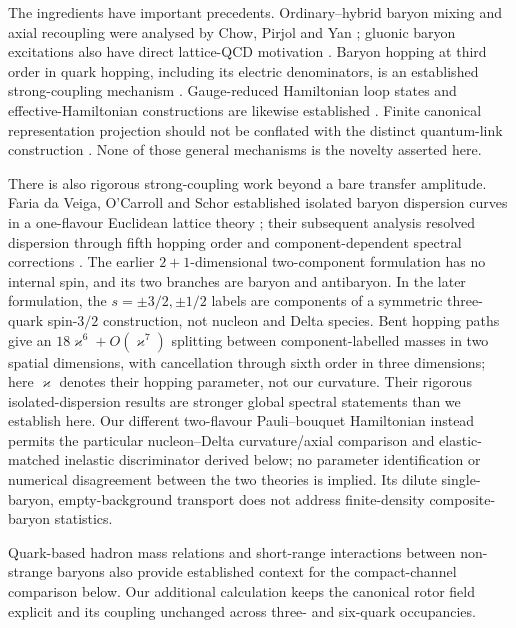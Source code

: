 \documentclass[11pt]{article}
\begin{document}
The ingredients have important precedents. Ordinary--hybrid baryon mixing and axial recoupling were analysed by Chow, Pirjol and Yan \cite{Chow1999HybridBaryons}; gluonic baryon excitations also have direct lattice-QCD motivation \cite{Dudek2012HybridBaryons}. Baryon hopping at third order in quark hopping, including its electric denominators, is an established strong-coupling mechanism \cite{Bringoltz2003StrongCouplingBaryons,Unger2022StrongCouplingExpansion}. Gauge-reduced Hamiltonian loop states and effective-Hamiltonian constructions are likewise established \cite{Ligterink2000HamiltonianLatticeGaugeTheory,Ligterink2001StatesEffectiveHamiltonians}. Finite canonical representation projection should not be conflated with the distinct quantum-link construction \cite{Chandrasekharan1997QuantumLinkModels}. None of those general mechanisms is the novelty asserted here.

There is also rigorous strong-coupling work beyond a bare transfer amplitude. Faria da Veiga, O'Carroll and Schor established isolated baryon dispersion curves in a one-flavour Euclidean lattice theory \cite{FariaDaVeiga2003UnderstandingBaryons}; their subsequent analysis resolved dispersion through fifth hopping order and component-dependent spectral corrections \cite{FariaDaVeiga2004BaryonSpectrum}. The earlier $2+1$-dimensional two-component formulation has no internal spin, and its two branches are baryon and antibaryon. In the later formulation, the $s=\pm3/2,\pm1/2$ labels are components of a symmetric three-quark spin-$3/2$ construction, not nucleon and Delta species. Bent hopping paths give an $18\varkappa^6+O(\varkappa^7)$ splitting between component-labelled masses in two spatial dimensions, with cancellation through sixth order in three dimensions; here $\varkappa$ denotes their hopping parameter, not our curvature. Their rigorous isolated-dispersion results are stronger global spectral statements than we establish here. Our different two-flavour Pauli--bouquet Hamiltonian instead permits the particular nucleon--Delta curvature/axial comparison and elastic-matched inelastic discriminator derived below; no parameter identification or numerical disagreement between the two theories is implied. Its dilute single-baryon, empty-background transport does not address finite-density composite-baryon statistics.

Quark-based hadron mass relations \cite{DeRujula1975HadronMasses} and short-range interactions between non-strange baryons \cite{Oka1981ShortRangeBaryonInteraction} also provide established context for the compact-channel comparison below. Our additional calculation keeps the canonical rotor field explicit and its coupling unchanged across three- and six-quark occupancies.
\end{document}
